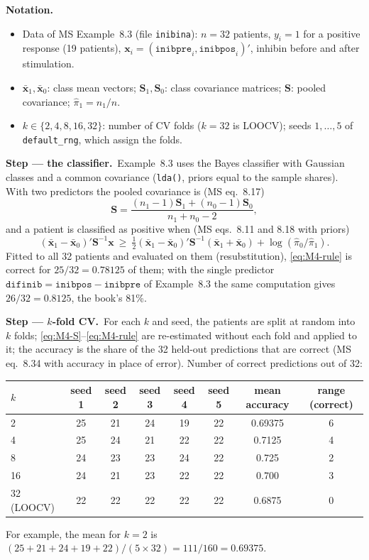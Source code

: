 \documentclass[11pt,a4paper]{article}
\numberwithin{equation}{questao}   %
\newenvironment{notacao}{\par\smallskip\noindent\textbf{Notation.}\begin{itemize}[leftmargin=1.4em,topsep=1pt,itemsep=0pt]\small}{\end{itemize}}
\newcommand{\passo}[2]{\par\smallskip\noindent\textbf{Step --- #1.}~#2}
\begin{document}
\begin{sol}
\begin{notacao}
\item Data of MS Example~8.3 (file \texttt{inibina}): $n=32$ patients, $y_i=1$ for a positive response
  (19 patients), $\mathbf x_i=(\texttt{inibpre}_i,\texttt{inibpos}_i)'$, inhibin before and after stimulation.
\item $\bar{\mathbf x}_1,\bar{\mathbf x}_0$: class mean vectors; $\mathbf S_1,\mathbf S_0$: class covariance
  matrices; $\mathbf S$: pooled covariance; $\hat\pi_1=n_1/n$.
\item $k\in\{2,4,8,16,32\}$: number of CV folds ($k=32$ is LOOCV); seeds $1,\dots,5$ of
  \texttt{default\_rng}, which assign the folds.
\end{notacao}

\passo{the classifier}{Example~8.3 uses the Bayes classifier with Gaussian classes and a common
covariance (\texttt{lda()}, priors equal to the sample shares). With two predictors the pooled
covariance is (MS eq.~8.17)
\begin{equation}\label{eq:M4-S}
\mathbf S=\frac{(n_1-1)\mathbf S_1+(n_0-1)\mathbf S_0}{n_1+n_0-2},
\end{equation}
and a patient is classified as positive when (MS eqs.~8.11 and 8.18 with priors)
\begin{equation}\label{eq:M4-rule}
(\bar{\mathbf x}_1-\bar{\mathbf x}_0)'\mathbf S^{-1}\mathbf x\ \ge\ \tfrac12(\bar{\mathbf x}_1-\bar{\mathbf x}_0)'\mathbf S^{-1}(\bar{\mathbf x}_1+\bar{\mathbf x}_0)+\log(\hat\pi_0/\hat\pi_1).
\end{equation}
Fitted to all 32 patients and evaluated on them (resubstitution), \eqref{eq:M4-rule} is correct for
$25/32=0.78125$ of them; with the single predictor $\texttt{difinib}=\texttt{inibpos}-\texttt{inibpre}$ of
Example~8.3 the same computation gives $26/32=0.8125$, the book's 81\%.}

\passo{$k$-fold CV}{For each $k$ and seed, the patients are split at random into $k$ folds;
\eqref{eq:M4-S}--\eqref{eq:M4-rule} are re-estimated without each fold and applied to it; the
accuracy is the share of the 32 held-out predictions that are correct (MS eq.~8.34 with accuracy in
place of error). Number of correct predictions out of 32:
\begin{center}\begin{tabular}{lccccccc}\toprule
$k$ & seed 1 & seed 2 & seed 3 & seed 4 & seed 5 & mean accuracy & range (correct)\\\midrule
2 & 25 & 21 & 24 & 19 & 22 & 0.69375 & 6\\
4 & 25 & 24 & 21 & 22 & 22 & 0.7125 & 4\\
8 & 24 & 23 & 23 & 24 & 22 & 0.725 & 2\\
16 & 24 & 21 & 23 & 22 & 22 & 0.700 & 3\\
32 (LOOCV) & 22 & 22 & 22 & 22 & 22 & 0.6875 & 0\\\bottomrule\end{tabular}\end{center}
For example, the mean for $k=2$ is $(25+21+24+19+22)/(5\times32)=111/160=0.69375$.}


\end{sol}
\end{document}
